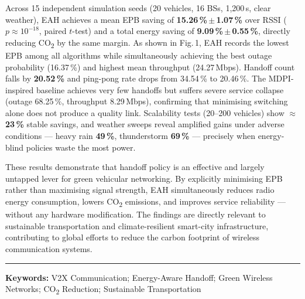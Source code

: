 \documentclass[10pt, a4paper]{article}
\begin{document}
Across 15 independent simulation seeds (20 vehicles, 16 BSs, 1{,}200\,s, clear weather),
EAH achieves a mean EPB saving of \textbf{15.26\,\%\,$\pm$\,1.07\,\%} over RSSI
($p \approx 10^{-18}$, paired $t$-test) and a total energy saving of
\textbf{9.09\,\%\,$\pm$\,0.55\,\%}, directly reducing CO\textsubscript{2} by the same
margin. As shown in Fig.\,1, EAH records the lowest EPB among all algorithms
while simultaneously achieving the best outage probability (16.37\,\%) and highest mean
throughput (24.27\,Mbps). Handoff count falls by \textbf{20.52\,\%} and ping-pong rate
drops from 34.54\,\% to 20.46\,\%. The MDPI-inspired baseline achieves very few handoffs
but suffers severe service collapse (outage 68.25\,\%, throughput 8.29\,Mbps), confirming
that minimising switching alone does not produce a quality link. Scalability tests
(20--200 vehicles) show \textbf{$\approx$23\,\%} stable savings, and weather sweeps reveal
amplified gains under adverse conditions --- heavy rain \textbf{49\,\%}, thunderstorm
\textbf{69\,\%} --- precisely when energy-blind policies waste the most power.

These results demonstrate that handoff policy is an effective and largely untapped lever
for green vehicular networking. By explicitly minimising EPB rather than maximising signal
strength, EAH simultaneously reduces radio energy consumption, lowers CO\textsubscript{2}
emissions, and improves service reliability --- without any hardware modification. The
findings are directly relevant to sustainable transportation and climate-resilient smart-city
infrastructure, contributing to global efforts to reduce the carbon footprint of wireless
communication systems.

\vspace{2pt}
\hrule
\vspace{2pt}

\noindent\textbf{Keywords:}
V2X Communication;\;
Energy-Aware Handoff;\;
Green Wireless Networks;\;
CO\textsubscript{2} Reduction;\;
Sustainable Transportation
\end{document}
